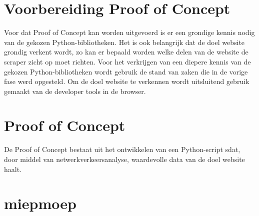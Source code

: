 \section{Voorbereiding Proof of Concept}
Voor dat Proof of Concept kan worden uitgevoerd is er een grondige kennis nodig van de gekozen Python-bibliotheken. Het is ook belangrijk dat de doel website grondig verkent wordt, zo kan er bepaald worden welke delen van de website de scraper zicht op moet richten. Voor het verkrijgen van een diepere kennis van de gekozen Python-bibliotheken wordt gebruik de stand van zaken die in de vorige fase werd opgesteld. Om de doel website te verkennen wordt uitsluitend gebruik gemaakt van de developer tools in de browser.

\section{Proof of Concept}
De Proof of Concept bestaat uit het ontwikkelen van een Python-script sdat, door middel van netwerkverkeersanalyse, waardevolle data van de doel website haalt.

\section{miepmoep}
